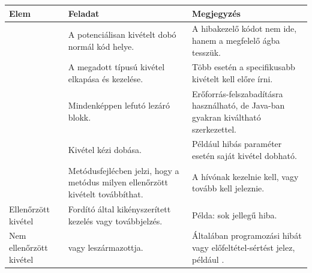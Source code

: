 \begin{tabularx}{\textwidth}{L{29mm}L{48mm}X}
\toprule
\textbf{Elem} & \textbf{Feladat} & \textbf{Megjegyzés} \\
\midrule
{} & A potenciálisan kivételt dobó normál kód helye. & A hibakezelő kódot nem ide, hanem a megfelelő  ágba tesszük. \\
 & A megadott típusú kivétel elkapása és kezelése. & Több  esetén a specifikusabb kivételt kell előre írni. \\
 & Mindenképpen lefutó lezáró blokk. & Erőforrás-felszabadításra használható, de Java-ban gyakran kiváltható  szerkezettel. \\
 & Kivétel kézi dobása. & Például hibás paraméter esetén saját kivétel dobható. \\
 & Metódusfejlécben jelzi, hogy a metódus milyen ellenőrzött kivételt továbbíthat. & A hívónak kezelnie kell, vagy tovább kell jeleznie. \\
Ellenőrzött kivétel & Fordító által kikényszerített kezelés vagy továbbjelzés. & Példa: sok  jellegű hiba. \\
Nem ellenőrzött kivétel &  vagy leszármazottja. & Általában programozási hibát vagy előfeltétel-sértést jelez, például . \\
\bottomrule
\end{tabularx}
